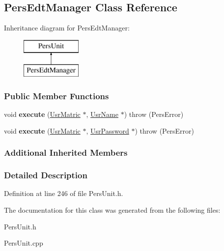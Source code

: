 \hypertarget{classPersEdtManager}{\subsection{Pers\-Edt\-Manager Class Reference}
\label{da/dab/classPersEdtManager}
}
Inheritance diagram for Pers\-Edt\-Manager\-:\begin{figure}[H]
\begin{center}
\leavevmode
\includegraphics[height=2.000000cm]{da/dab/classPersEdtManager}
\end{center}
\end{figure}
\subsubsection*{Public Member Functions}
\begin{DoxyCompactItemize}
\item 
\hypertarget{classPersEdtManager_a537ffad367877114dc9c159fd1eb346e}{void {\bfseries execute} (\hyperlink{classUsrMatric}{Usr\-Matric} $\ast$, \hyperlink{classUsrName}{Usr\-Name} $\ast$)  throw (\-Pers\-Error)}\label{da/dab/classPersEdtManager_a537ffad367877114dc9c159fd1eb346e}

\item 
\hypertarget{classPersEdtManager_a7fa79580f771a5798e819a55ae5fb815}{void {\bfseries execute} (\hyperlink{classUsrMatric}{Usr\-Matric} $\ast$, \hyperlink{classUsrPassword}{Usr\-Password} $\ast$)  throw (\-Pers\-Error)}\label{da/dab/classPersEdtManager_a7fa79580f771a5798e819a55ae5fb815}

\end{DoxyCompactItemize}
\subsubsection*{Additional Inherited Members}


\subsubsection{Detailed Description}


Definition at line 246 of file Pers\-Unit.\-h.



The documentation for this class was generated from the following files\-:\begin{DoxyCompactItemize}
\item 
Pers\-Unit.\-h\item 
Pers\-Unit.\-cpp\end{DoxyCompactItemize}
